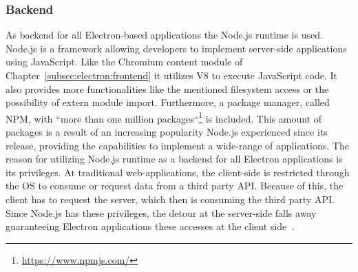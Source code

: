 \subsubsection{Backend}
\label{subsec:electron:backend}
As backend for all Electron-based applications the Node.js runtime is used.
Node.js is a framework allowing developers to implement server-side applications using JavaScript.
Like the Chromium content module of Chapter~\ref{subsec:electron:frontend} it utilizes V8 to execute JavaScript code.
It also provides more functionalities like the mentioned filesystem access or the possibility of extern module import.
Furthermore, a pack\-age manager, called \ac{NPM}, with ``more than one million packages``\footnote{\url{https://www.npmjs.com/}} is included.
This amount of packages is a result of an increasing popularity Node.js experienced since its release, providing the capabilities to implement a wide-range of applications.
The reason for utilizing Node.js runtime as a backend for all Electron applications is its privileges.
At traditional web-applications, the client-side is restricted through the \ac{OS} to consume or request data from a third party \ac{API}\@.
Because of this, the client has to request the server, which then is consuming the third party \ac{API}\@.
Since Node.js has these privileges, the detour at the server-side falls away guaranteeing Electron applications these accesses at the client side~\cite{electron-in-action, electron-nwjs}.


